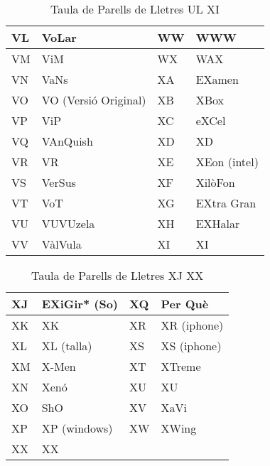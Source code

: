 \begin{table}[!ht]
\begin{tabular}{|l|l|l|l|}
    VL & VoLar                & WW & WWW               \\ \hline
    VM & ViM                  & WX & WAX               \\ \hline
    VN & VaNs                 & XA & EXamen            \\ \hline
    VO & VO (Versió Original) & XB & XBox              \\ \hline
    VP & ViP                  & XC & eXCel             \\ \hline
    VQ & VAnQuish             & XD & XD                \\ \hline
    VR & VR                   & XE & XEon (intel)      \\ \hline
    VS & VerSus               & XF & XilòFon           \\ \hline
    VT & VoT                  & XG & EXtra Gran        \\ \hline
    VU & VUVUzela             & XH & EXHalar           \\ \hline
    VV & VàlVula              & XI & XI                \\ \hline
    \end{tabular}
    \caption{Taula de Parells de Lletres UL \rightarrow XI}
    \label{tla:lletres-8}
    \end{table}  

\begin{table}[!ht]
    \centering
    \begin{tabular}{|l|l|l|l|}
    \hline
    XJ & EXiGir* (So) & XQ & Per Què     \\ \hline
    XK & XK           & XR & XR (iphone) \\ \hline
    XL & XL (talla)   & XS & XS (iphone) \\ \hline
    XM & X-Men        & XT & XTreme      \\ \hline
    XN & Xenó         & XU & XU          \\ \hline
    XO & ShO          & XV & XaVi        \\ \hline
    XP & XP (windows) & XW & XWing       \\ \hline
    XX   & XX              &  &          \\ \hline
    \end{tabular}
    \caption{Taula de Parells de Lletres XJ \rightarrow XX}
    \label{tla:lletres-9}
    \end{table}





